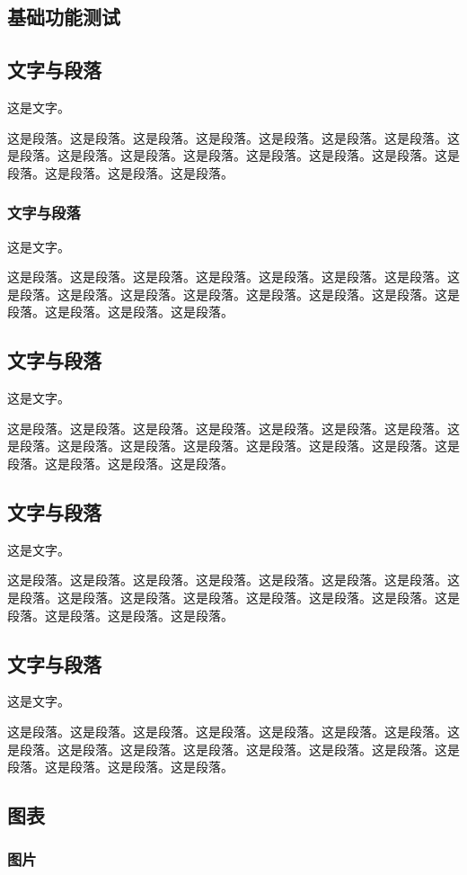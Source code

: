 \begin{ujnbody}
    \chapter{基础功能测试}
    \section{文字与段落}
    这是文字。

    这是段落。这是段落。这是段落。这是段落。这是段落。这是段落。这是段落。这是段落。这是段落。这是段落。这是段落。这是段落。这是段落。这是段落。这是段落。这是段落。这是段落。这是段落。
    \subsection{文字与段落}
    这是文字。

    这是段落。这是段落。这是段落。这是段落。这是段落。这是段落。这是段落。这是段落。这是段落。这是段落。这是段落。这是段落。这是段落。这是段落。这是段落。这是段落。这是段落。这是段落。
    \section{文字与段落}
    这是文字。

    这是段落。这是段落。这是段落。这是段落。这是段落。这是段落。这是段落。这是段落。这是段落。这是段落。这是段落。这是段落。这是段落。这是段落。这是段落。这是段落。这是段落。这是段落。
    \section{文字与段落}
    这是文字。

    这是段落。这是段落。这是段落。这是段落。这是段落。这是段落。这是段落。这是段落。这是段落。这是段落。这是段落。这是段落。这是段落。这是段落。这是段落。这是段落。这是段落。这是段落。
    \section{文字与段落}
    这是文字。

    这是段落。这是段落。这是段落。这是段落。这是段落。这是段落。这是段落。这是段落。这是段落。这是段落。这是段落。这是段落。这是段落。这是段落。这是段落。这是段落。这是段落。这是段落。
    \section{图表}

    \subsection{图片}


\end{ujnbody}
